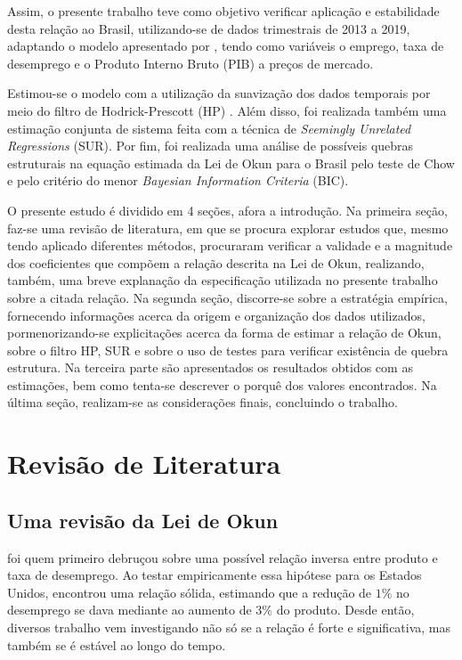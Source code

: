 \documentclass[12pt, openright,oneside, a4paper, english, brazil, section = TITLE, ubsection = Title]{article}
\begin{document}
Assim, o presente trabalho teve como objetivo verificar aplicação e estabilidade desta relação ao Brasil, utilizando-se de dados trimestrais de 2013 a 2019, adaptando o modelo apresentado por , tendo como variáveis o emprego, taxa de desemprego e o Produto Interno Bruto (PIB) a preços de mercado. 

Estimou-se o modelo com a utilização da suavização dos dados temporais por meio do filtro de Hodrick-Prescott (HP) \cite{Hodrick1997}. Além disso, foi realizada também uma estimação conjunta de sistema feita com a técnica de \textit{Seemingly Unrelated Regressions} (SUR). Por fim, foi realizada uma análise de possíveis quebras estruturais na equação estimada da Lei de Okun para o Brasil pelo teste de Chow e pelo critério do menor \textit{Bayesian Information Criteria} (BIC).

O presente estudo é dividido em 4 seções, afora a introdução. Na primeira seção, faz-se uma revisão de literatura, em que se procura explorar estudos que, mesmo tendo aplicado diferentes métodos, procuraram verificar a validade e a magnitude dos coeficientes que compõem a relação descrita na Lei de Okun, realizando, também, uma breve explanação da especificação utilizada no presente trabalho sobre a citada relação. Na segunda seção, discorre-se sobre a estratégia empírica, fornecendo informações acerca da origem e organização dos dados utilizados, pormenorizando-se explicitações acerca da forma de estimar a relação de Okun, sobre o filtro HP, SUR e sobre o uso de testes para verificar existência de quebra estrutura. Na terceira parte são apresentados os resultados obtidos com as estimações, bem como tenta-se descrever o porquê dos valores encontrados. Na última seção, realizam-se as considerações finais, concluindo o trabalho.

\section{Revisão de Literatura}

\subsection{Uma revisão da Lei de Okun}

 foi quem primeiro debruçou sobre uma possível relação inversa entre produto e taxa de desemprego. Ao testar empiricamente essa hipótese para os Estados Unidos, encontrou uma relação sólida, estimando que a redução de $1\%$ no desemprego se dava mediante ao aumento de $3\%$ do produto. Desde então, diversos trabalho vem investigando não só se a relação é forte e significativa, mas também se é estável ao longo do tempo. 
\end{document}

